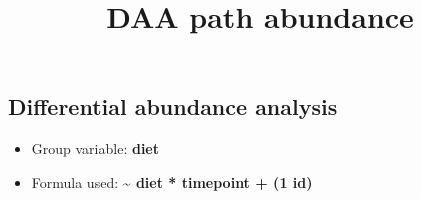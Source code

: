 \documentclass[
]{article}
\title{DAA path abundance}
\author{}
\date{}
\providecommand{\tightlist}{%
  \setlength{\itemsep}{0pt}\setlength{\parskip}{0pt}}\usepackage{longtable,booktabs,array}
\begin{document}
\maketitle


\subsection{Differential abundance
analysis}\label{differential-abundance-analysis}

\begin{itemize}
\tightlist
\item
  Group variable: \textbf{diet}
\item
  Formula used: \textbf{\textasciitilde{} diet * timepoint + (1
  \textbar{} id)}
\end{itemize}
\end{document}
